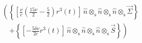 \begin{align*}&\left( \left\{ \left[ \frac{\nu}{c} \left(\frac{15 \nu}{2} - \frac{5}{2}\right) r^{3}{\left (t \right )} \right]\, \hat{n} \otimes_{\mathrm{s}} \hat{n} \otimes_{\mathrm{s}} \hat{n} \otimes_{\mathrm{s}} \vec{\Sigma} \right\} \right. \nonumber \\&\quad \left. + \left\{ \left[ - \frac{5 \delta \nu}{2 c} r^{3}{\left (t \right )} \right]\, \hat{n} \otimes_{\mathrm{s}} \hat{n} \otimes_{\mathrm{s}} \hat{n} \otimes_{\mathrm{s}} \vec{S} \right\} \right)\\\end{align*}